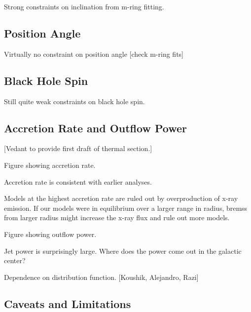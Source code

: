 Strong constraints on inclination from m-ring fitting.

\subsection{Position Angle}

Virtually no constraint on position angle [check m-ring fits]

\subsection{Black Hole Spin}

Still quite weak constraints on black hole spin.

\subsection{Accretion Rate and Outflow Power}

[Vedant to provide first draft of thermal section.]

Figure showing accretion rate.

Accretion rate is consistent with earlier analyses.  

Models at the highest accretion rate are ruled out by overproduction of x-ray emission.  If our models were in equilibrium over a larger range in radius, bremss from larger radius might increase the x-ray flux and rule out more models.

Figure showing outflow power.

Jet power is surprisingly large.  Where does the power come out in the galactic center?

Dependence on distribution function. [Koushik, Alejandro, Razi]


\subsection{Caveats and Limitations}

